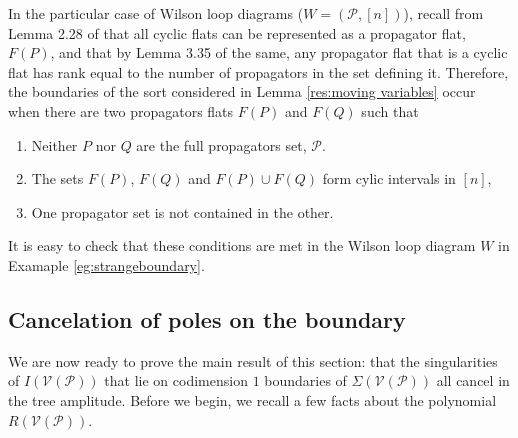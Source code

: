 \documentclass[11pt]{article}
\newcommand{\drawWLD}[2]{

\pgfmathsetmacro{\n}{#1}
\pgfmathsetmacro{\radius}{#2}
\pgfmathsetmacro{\angle}{360/\n}
\draw (0,0) circle (\radius);
    \foreach \i in {1,2,...,\n} {
      \draw (\angle*\i:\radius) node {$\bullet$};
    }

}
\newcommand{\drawprop}[4]{
\pgfmathsetmacro{\r}{#1}
\pgfmathsetmacro{\bumpr}{#2}
\pgfmathsetmacro{\s}{#3}
\pgfmathsetmacro{\bumps}{#4}
\pgfmathsetmacro{\perturbe}{\angle/\n}
\begin{scope}
\draw[smallpropagator] (\angle*\r + \angle/2 + \bumpr*\perturbe:\radius) -- (\angle*\s + \angle/2 + \bumps*\perturbe:\radius);
\end{scope}
}
\newcommand{\drawnumbers}{
  \foreach \i in {1,2,...,\n} {
  \pgfmathsetmacro{\x}{\angle*\i}
  \draw (\x:\radius*1.25) node {\footnotesize \i};
}
}
\def\ba #1\ea{\begin{align} #1 \end{align}}
\def\bas #1\eas{\begin{align*} #1 \end{align*}}
\newcommand{\cP}{\mathcal{P}}
\newcommand{\cV}{\mathcal{V}}
\newcommand{\VP}{\cV(\cP)}
\theoremstyle{remark}
\theoremstyle{definition}
\begin{document}
In the particular case of Wilson loop diagrams ($W = (\cP, [n])$), recall from Lemma 2.28 of \cite{Wilsonloop} that all cyclic flats can be represented as a propagator flat, $F(P)$, and that by Lemma 3.35 of the same, any propagator flat that is a cyclic flat has rank equal to the number of propagators in the set defining it. Therefore, the boundaries of the sort considered in Lemma \ref{res:moving variables} occur when there are two propagators flats $F(P)$ and $F(Q)$ such that \begin{enumerate} \item Neither $P$ nor $Q$ are the full propagators set, $\cP$. \item The sets $F(P)$, $F(Q)$ and $F(P) \cup F(Q)$ form cylic intervals in $[n]$, \item One propagator set is not contained in the other. \end{enumerate} It is easy to check that these conditions are met in the Wilson loop diagram $W$ in Examaple \ref{eg:strangeboundary}.


\subsection{Cancelation of poles on the boundary \label{sec:cancelation}}

We are now ready to prove the main result of this section: that the singularities of $I(\VP)$ that lie on codimension $1$ boundaries of $\Sigma(\VP)$ all cancel in the tree amplitude. Before we begin, we recall a few facts about the polynomial $R(\VP)$. %
\end{document}
